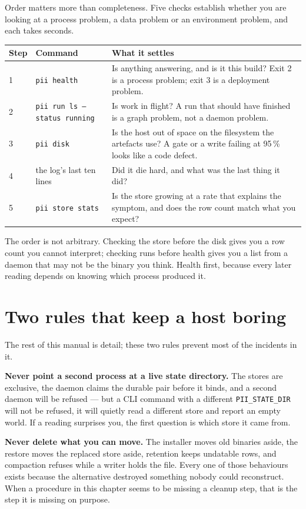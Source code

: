 Order matters more than completeness. Five checks establish whether you are looking at a
process problem, a data problem or an environment problem, and each takes seconds.

\begin{longtable}{@{}p{}p{}p{}@{}}
	\toprule
	\textbf{Step} & \textbf{Command} & \textbf{What it settles} \\
	\midrule
	\endhead
	1 & \texttt{pii health} & Is anything answering, and is it this build? Exit 2 is a
	process problem; exit 3 is a deployment problem. \\
	2 & \texttt{pii run ls --status running} & Is work in flight? A run that should have
	finished is a graph problem, not a daemon problem. \\
	3 & \texttt{pii disk} & Is the host out of space on the filesystem the artefacts use?
	A gate or a write failing at 95\,\% looks like a code defect. \\
	4 & the log's last ten lines & Did it die hard, and what was the last thing it did? \\
	5 & \texttt{pii store stats} & Is the store growing at a rate that explains the
	symptom, and does the row count match what you expect? \\
	\bottomrule
\end{longtable}

The order is not arbitrary. Checking the store before the disk gives you a row count you
cannot interpret; checking runs before health gives you a list from a daemon that may not
be the binary you think. Health first, because every later reading depends on knowing which
process produced it.

\section{Two rules that keep a host boring}

The rest of this manual is detail; these two rules prevent most of the incidents in it.

\textbf{Never point a second process at a live state directory.} The stores are exclusive,
the daemon claims the durable pair before it binds, and a second daemon will be refused ---
but a CLI command with a different \texttt{PII\_STATE\_DIR} will not be refused, it will
quietly read a different store and report an empty world. If a reading surprises you, the
first question is which store it came from.

\textbf{Never delete what you can move.} The installer moves old binaries aside, the
restore moves the replaced store aside, retention keeps undatable rows, and compaction
refuses while a writer holds the file. Every one of those behaviours exists because the
alternative destroyed something nobody could reconstruct. When a procedure in this chapter
seems to be missing a cleanup step, that is the step it is missing on purpose.
